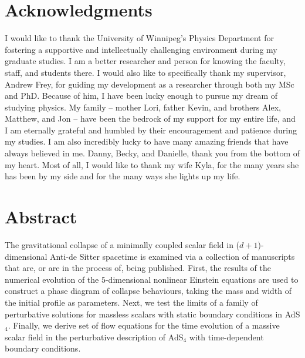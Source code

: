 \documentclass[12pt, a4paper]{report} %
\numberwithin{equation}{chapter}
\begin{document}
\section*{Acknowledgments}
I would like to thank the University of Winnipeg's Physics Department for fostering a supportive and intellectually challenging environment during my graduate studies. I am a better researcher and person for knowing the faculty, staff, and students there.
I would also like to specifically thank my supervisor, Andrew Frey, for guiding my development as a researcher through both my MSc and PhD. Because of him, I have been lucky enough to pursue my dream of studying physics.
My family -- mother Lori, father Kevin, and brothers Alex, Matthew, and Jon -- have been the bedrock of my support for my entire life, and I am eternally grateful and humbled by their encouragement and patience during my studies. I am also incredibly lucky to have many amazing friends that have always believed in me. Danny, Becky, and Danielle, thank you from the bottom of my heart. Most of all, I would like to thank my wife Kyla, for the many years she has been by my side and for the many ways she lights up my life.

\vspace*{\fill}
\clearpage

\newpage

\vspace*{\fill}
\section*{Abstract}

The gravitational collapse of a minimally coupled scalar field in ($d + 1$)-dimensional Anti-de Sitter spacetime is examined via a collection of manuscripts that are, or are in the process of, being published. First, the results of the numerical evolution of the $5$-dimensional nonlinear Einstein equations are used to construct a phase diagram of collapse behaviours, taking the mass and width of the initial profile as parameters. Next, we test the limits of a family of perturbative solutions for massless scalars with static boundary conditions in AdS$_4$. Finally, we derive set of flow equations for the time evolution of a massive scalar field in the perturbative description of AdS$_4$ with time-dependent boundary conditions. 

\vspace*{\fill}
\clearpage
\end{document}
